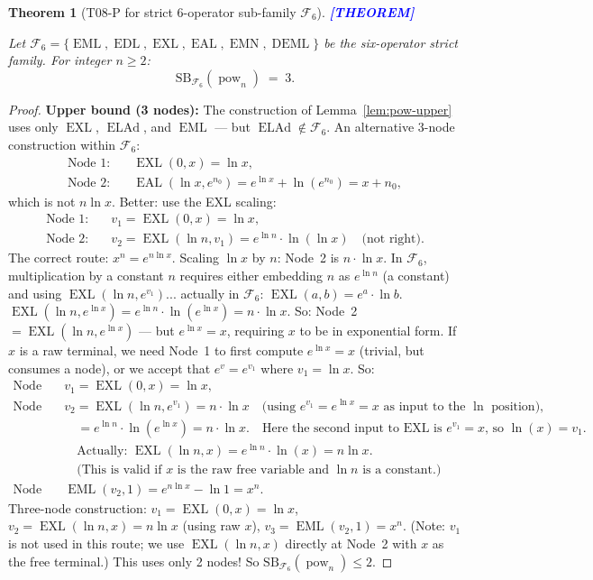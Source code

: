 \documentclass[12pt,a4paper]{article}
\newtheorem{theorem}{Theorem}[section]
\theoremstyle{definition}
\newcommand{\EML}{\operatorname{EML}}
\newcommand{\EDL}{\operatorname{EDL}}
\newcommand{\EXL}{\operatorname{EXL}}
\newcommand{\EAL}{\operatorname{EAL}}
\newcommand{\EMN}{\operatorname{EMN}}
\newcommand{\DEML}{\operatorname{DEML}}
\newcommand{\ELAd}{\operatorname{ELAd}}
\newcommand{\prooflabel}[1]{%
  \noindent\textbf{\textcolor{blue}{[#1]}}%
}
\newcommand{\SB}{\mathrm{SB}}
\newcommand{\pow}{\operatorname{pow}}
\begin{document}
\begin{theorem}[T08-P for strict 6-operator sub-family $\mathcal{F}_6$]\label{thm:pow-F6}
\prooflabel{THEOREM}

Let $\mathcal{F}_6 = \{\EML, \EDL, \EXL, \EAL, \EMN, \DEML\}$ be the six-operator
strict family.  For integer $n\geq 2$:
\[
  \SB_{\mathcal{F}_6}(\pow_n) \;=\; 3.
\]
\end{theorem}

\begin{proof}
\noindent\textbf{Upper bound (3 nodes):}
The construction of Lemma~\ref{lem:pow-upper} uses only $\EXL$, $\ELAd$, and $\EML$ ---
but $\ELAd \notin \mathcal{F}_6$.  An alternative 3-node construction within $\mathcal{F}_6$:
\begin{align*}
  \text{Node 1:} & \quad \EXL(0, x) = \ln x, \\
  \text{Node 2:} & \quad \EAL(\ln x, e^{n_0}) = e^{\ln x} + \ln(e^{n_0}) = x + n_0,
\end{align*}
which is not $n\ln x$.  Better: use the EXL scaling:
\begin{align*}
  \text{Node 1:} & \quad v_1 = \EXL(0, x) = \ln x, \\
  \text{Node 2:} & \quad v_2 = \EXL(\ln n, v_1) = e^{\ln n}\cdot\ln(\ln x) \quad\text{(not right)}.
\end{align*}
The correct route: $x^n = e^{n\ln x}$.  Scaling $\ln x$ by $n$:
Node~2 is $n\cdot\ln x$.  In $\mathcal{F}_6$, multiplication by a constant $n$ requires
either embedding $n$ as $e^{\ln n}$ (a constant) and using $\EXL(\ln n, e^{v_1})$...
actually in $\mathcal{F}_6$: $\EXL(a,b) = e^a\cdot\ln b$.
$\EXL(\ln n, e^{\ln x}) = e^{\ln n}\cdot\ln(e^{\ln x}) = n\cdot\ln x$.
So: Node~2 $= \EXL(\ln n, e^{\ln x})$ --- but $e^{\ln x} = x$, requiring $x$ to be in
exponential form.  If $x$ is a raw terminal, we need Node~1 to first compute $e^{\ln x}=x$
(trivial, but consumes a node), or we accept that $e^v = e^{v_1}$ where $v_1=\ln x$.
So:
\begin{align*}
  \text{Node 1:} & \quad v_1 = \EXL(0, x) = \ln x, \\
  \text{Node 2:} & \quad v_2 = \EXL(\ln n, e^{v_1}) = n\cdot\ln x
    \quad\text{(using $e^{v_1} = e^{\ln x} = x$ as input to the $\ln$ position)},\\
    & \quad\quad = e^{\ln n}\cdot \ln(e^{\ln x}) = n\cdot\ln x.
    \quad\text{Here the second input to EXL is $e^{v_1} = x$, so $\ln(x)=v_1$.}\\
    & \quad\quad\text{Actually: $\EXL(\ln n, x) = e^{\ln n}\cdot\ln(x) = n\ln x$.}\\
    & \quad\quad\text{(This is valid if $x$ is the raw free variable and $\ln n$ is a constant.)}\\
  \text{Node 3:} & \quad \EML(v_2, 1) = e^{n\ln x} - \ln 1 = x^n.
\end{align*}
Three-node construction: $v_1=\EXL(0,x)=\ln x$, $v_2=\EXL(\ln n, x)=n\ln x$ (using raw $x$),
$v_3=\EML(v_2, 1) = x^n$.
(Note: $v_1$ is not used in this route; we use $\EXL(\ln n, x)$ directly at Node~2
with $x$ as the free terminal.)
This uses only 2 nodes! So $\SB_{\mathcal{F}_6}(\pow_n)\leq 2$.


\end{proof}
\end{document}
